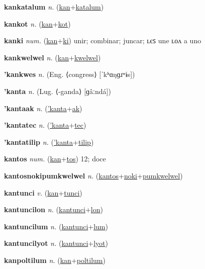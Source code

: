 \textbf{\hypertarget{kankatalum}{kankatalum}} \textit{n.} (\hyperlink{kan}{kan}+\allowbreak \hyperlink{katalum}{katalum})


\textbf{\hypertarget{kankot}{kankot}} \textit{n.} (\hyperlink{kan}{kan}+\allowbreak \hyperlink{kot}{kot})


\textbf{\hypertarget{kanki}{kanki}} \textit{num.} (\hyperlink{kan}{kan}+\allowbreak \hyperlink{ki}{ki})
unir; combinar; juncar; ʟєꜱ une ʟᴏᴧ a uno

\textbf{\hypertarget{kankwelwel}{kankwelwel}} \textit{n.} (\hyperlink{kan}{kan}+\allowbreak \hyperlink{kwelwel}{kwelwel})


\textbf{\hypertarget{'kankwes}{'kankwes}} \textit{n.} (Eng. ⟨congress⟩ [ˈkʰɑŋɡɹʷɨs])


\textbf{\hypertarget{'kanta}{'kanta}} \textit{n.} (Lug. ⟨-ganda⟩ [ɡâːndá])


\textbf{\hypertarget{'kantaak}{'kantaak}} \textit{n.} (\hyperlink{'kanta}{'kanta}+\allowbreak \hyperlink{ak}{ak})


\textbf{\hypertarget{'kantatec}{'kantatec}} \textit{n.} (\hyperlink{'kanta}{'kanta}+\allowbreak \hyperlink{tec}{tec})


\textbf{\hypertarget{'kantatilip}{'kantatilip}} \textit{n.} (\hyperlink{'kanta}{'kanta}+\allowbreak \hyperlink{tilip}{tilip})


\textbf{\hypertarget{kantos}{kantos}} \textit{num.} (\hyperlink{kan}{kan}+\allowbreak \hyperlink{tos}{tos})
12; doce

\textbf{\hypertarget{kantosnokipumkwelwel}{kantosnokipumkwelwel}} \textit{n.} (\hyperlink{kantos}{kantos}+\allowbreak \hyperlink{noki}{noki}+\allowbreak \hyperlink{pumkwelwel}{pumkwelwel})


\textbf{\hypertarget{kantunci}{kantunci}} \textit{v.} (\hyperlink{kan}{kan}+\allowbreak \hyperlink{tunci}{tunci})


\textbf{\hypertarget{kantuncilon}{kantuncilon}} \textit{n.} (\hyperlink{kantunci}{kantunci}+\allowbreak \hyperlink{lon}{lon})


\textbf{\hypertarget{kantuncilum}{kantuncilum}} \textit{n.} (\hyperlink{kantunci}{kantunci}+\allowbreak \hyperlink{lum}{lum})


\textbf{\hypertarget{kantuncilyot}{kantuncilyot}} \textit{n.} (\hyperlink{kantunci}{kantunci}+\allowbreak \hyperlink{lyot}{lyot})


\textbf{\hypertarget{kanpoltilum}{kanpoltilum}} \textit{n.} (\hyperlink{kan}{kan}+\allowbreak \hyperlink{poltilum}{poltilum})


